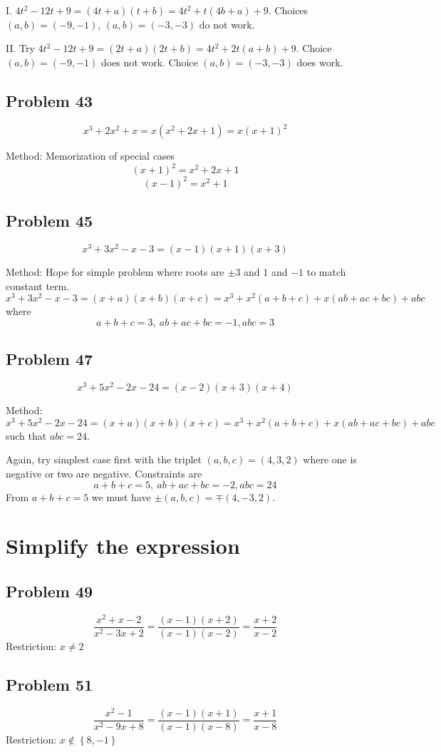\documentclass[11pt, oneside]{article}   	%
\begin{document}
\noindent I. $4 t^2-12 t+9 = (4t+a)(t+b) = 4 t^2 + t(4b+a) + 9$. Choices $(a,b) = (-9,-1)$, $(a,b) = (-3,-3)$ do not work.

\noindent II. Try $4 t^2-12 t+9 = (2t+a)(2t+b) = 4 t^2 + 2t(a+b) + 9$. Choice $(a,b) = (-9,-1)$ does not work. Choice $(a,b) = (-3,-3)$ does work.

\subsection{Problem 43}
$$x^3+2 x^2+x = x\left( x^2 + 2 x + 1 \right)=x (x+1)^2$$

Method: Memorization of special cases
$$(x+1)^2 = x^2+2x+1 $$
$$(x-1)^2 = x^2+1$$

\subsection{Problem 45}
$$x^3+3 x^2-x-3=(x-1) (x+1) (x+3)$$

Method: Hope for simple problem where roots are $\pm3$ and $1$ and $-1$ to match constant term. 
$$x^3+3 x^2-x-3 = (x + a) (x + b) (x + c) = x^{3} + x^{2}(a+b+c) + x (ab+ac+bc) + abc$$ where
$$a+b+c = 3, \ ab+ac+bc=-1, abc = 3 $$

\subsection{Problem 47}
$$x^3+5 x^2-2 x-24 = (x-2) (x+3) (x+4)$$

Method: $x^3+5 x^2-2 x-24 = (x+a) (x+b) (x+c) = x^{3} + x^{2}(a+b+c) + x (ab+ac+bc) + abc$ such that $abc=24$. 

Again, try simplest case first with the triplet
$(a,b,c)=(4,3,2)$ where one is negative or two are negative. Constraints are
$$a+b+c = 5, \ ab+ac+bc=-2, abc = 24 $$
From $a+b+c = 5$ we must have $\pm(a,b,c)=\mp(4,-3,2)$.

\section{Simplify the expression}

\subsection{Problem 49}
$$\frac{x^2+x-2}{x^2-3 x+2}
=\frac{(x-1) (x+2)}{(x-1) (x-2)}
=\frac{x+2}{x-2}$$
Restriction: $x\ne2$

\subsection{Problem 51}
$$\frac{x^2-1}{x^2-9 x+8} 
= \frac{(x-1)(x+1)}{(x-1)(x-8)}
= \frac{x+1}{x-8}$$
Restriction: $x\notin\left\{8,-1\right\}$
\end{document}
